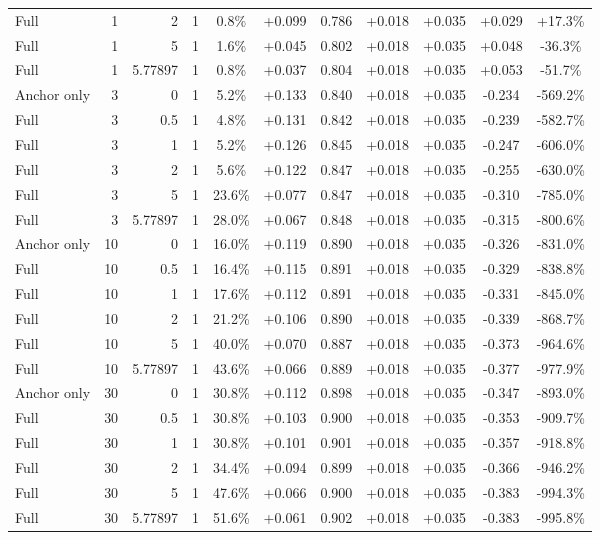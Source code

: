 \begin{table}[htbp]
\begin{tabular}{lrrrccccccc}
Full & 1 & 2 & 1 & 0.8\% & +0.099 & 0.786 & +0.018 & +0.035 & +0.029 & +17.3\% \\
Full & 1 & 5 & 1 & 1.6\% & +0.045 & 0.802 & +0.018 & +0.035 & +0.048 & -36.3\% \\
Full & 1 & 5.77897 & 1 & 0.8\% & +0.037 & 0.804 & +0.018 & +0.035 & +0.053 & -51.7\% \\
Anchor only & 3 & 0 & 1 & 5.2\% & +0.133 & 0.840 & +0.018 & +0.035 & -0.234 & -569.2\% \\
Full & 3 & 0.5 & 1 & 4.8\% & +0.131 & 0.842 & +0.018 & +0.035 & -0.239 & -582.7\% \\
Full & 3 & 1 & 1 & 5.2\% & +0.126 & 0.845 & +0.018 & +0.035 & -0.247 & -606.0\% \\
Full & 3 & 2 & 1 & 5.6\% & +0.122 & 0.847 & +0.018 & +0.035 & -0.255 & -630.0\% \\
Full & 3 & 5 & 1 & 23.6\% & +0.077 & 0.847 & +0.018 & +0.035 & -0.310 & -785.0\% \\
Full & 3 & 5.77897 & 1 & 28.0\% & +0.067 & 0.848 & +0.018 & +0.035 & -0.315 & -800.6\% \\
Anchor only & 10 & 0 & 1 & 16.0\% & +0.119 & 0.890 & +0.018 & +0.035 & -0.326 & -831.0\% \\
Full & 10 & 0.5 & 1 & 16.4\% & +0.115 & 0.891 & +0.018 & +0.035 & -0.329 & -838.8\% \\
Full & 10 & 1 & 1 & 17.6\% & +0.112 & 0.891 & +0.018 & +0.035 & -0.331 & -845.0\% \\
Full & 10 & 2 & 1 & 21.2\% & +0.106 & 0.890 & +0.018 & +0.035 & -0.339 & -868.7\% \\
Full & 10 & 5 & 1 & 40.0\% & +0.070 & 0.887 & +0.018 & +0.035 & -0.373 & -964.6\% \\
Full & 10 & 5.77897 & 1 & 43.6\% & +0.066 & 0.889 & +0.018 & +0.035 & -0.377 & -977.9\% \\
Anchor only & 30 & 0 & 1 & 30.8\% & +0.112 & 0.898 & +0.018 & +0.035 & -0.347 & -893.0\% \\
Full & 30 & 0.5 & 1 & 30.8\% & +0.103 & 0.900 & +0.018 & +0.035 & -0.353 & -909.7\% \\
Full & 30 & 1 & 1 & 30.8\% & +0.101 & 0.901 & +0.018 & +0.035 & -0.357 & -918.8\% \\
Full & 30 & 2 & 1 & 34.4\% & +0.094 & 0.899 & +0.018 & +0.035 & -0.366 & -946.2\% \\
Full & 30 & 5 & 1 & 47.6\% & +0.066 & 0.900 & +0.018 & +0.035 & -0.383 & -994.3\% \\
Full & 30 & 5.77897 & 1 & 51.6\% & +0.061 & 0.902 & +0.018 & +0.035 & -0.383 & -995.8\% \\

\end{tabular}
\end{table}

